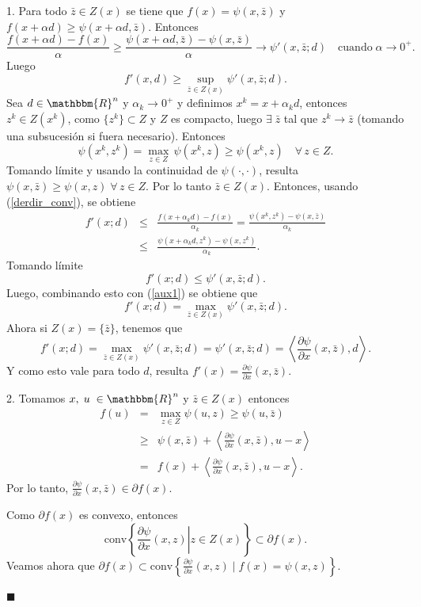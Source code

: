 \documentclass[a4paper,12pt]{report}
\newcommand{\la}{\langle}
\newcommand{\ra}{\rangle}
\newcommand{\RR}{\mathbbm{R}}
\newcommand{\Rn}{\RR^n}
\newcommand{\bz}{\bar{z}}
\newcommand{\sdif}{\partial f(x)}
\newcommand{\arr}{\rightarrow}
\newcommand{\larr}{\longrightarrow}
\newenvironment{dem}{\vspace*{-0.1cm}{\it Demostraci\'on:}}{\hfill
$\blacksquare$\\}
\begin{document}
\begin{dem}
1. Para todo $\bz\in Z(x)$ se tiene que $f(x)=\psi(x,\bz)$ y \linebreak $f(x+\alpha d)\geq\psi(x+\alpha d,\bz)$. Entonces
$$\frac{f(x+\alpha d) -f(x)}{\alpha}\geq\frac{\psi(x+\alpha d,\bz)-\psi(x,\bz)}{\alpha}\larr \psi '(x,\bz;d)\quad\mathrm{cuando}\;\alpha\arr 0^+.$$
Luego
\begin{equation}\label{aux1}
f'(x,d)\geq \sup_{\bz\in Z(x)}\psi '(x,\bz;d).
\end{equation}
Sea $d\in\Rn$ y $\alpha_k\arr 0^+$ y definimos $x^k=x+\alpha_{k}d$, entonces $z^k\in Z(x^k)$, como $\{z^k\}\subset Z$ y $Z$ es compacto, luego $\exists\;\bz$ tal que $z^k\arr \bz$ (tomando una subsucesi\'on si fuera necesario). Entonces 
$$\psi(x^k,z^k)=\max_{z\in Z}\,\psi(x^k,z)\geq\psi(x^k,z)\quad\forall\,z\in Z.$$
Tomando l\'imite y usando la continuidad de $\psi(\cdotp,\cdotp)$, resulta $\psi(x,\bz)\geq\psi(x,z)\;\forall\,z\in Z$. Por lo tanto $\bz\in Z(x)$. Entonces, usando (\ref{derdir_conv}), se obtiene 
\begin{eqnarray*}
f'(x;d)&\leq&\frac{f(x+\alpha_{k} d) -f(x)}{\alpha_{k}}=\frac{\psi(x^k,z^k)-\psi(x,\bz)}{\alpha_{k}}\\
&\leq &\frac{\psi(x+\alpha_{k} d,z^k)-\psi(x,z^k)}{\alpha_{k}}.
\end{eqnarray*}
Tomando l\'imite 
$$f'(x;d)\leq\psi '(x,\bz;d).$$
Luego, combinando esto con (\ref{aux1}) se obtiene que
$$f'(x;d)=\max_{\bz\in Z(x)}\psi '(x,\bz;d).$$
Ahora si $Z(x)=\{\bz\}$, tenemos que
$$f'(x;d)=\max_{\bz\in Z(x)}\psi '(x,\bz;d)=\psi '(x,\bz;d)=\left\la \frac{\partial \psi}{\partial x}(x,\bz),d\right\ra.$$
Y como esto vale para todo $d$, resulta $f'(x)=\frac{\partial\psi}{\partial x}(x,\bz).$

2. Tomamos $x,\;u\;\in\Rn$ y $\bz\in Z(x)$ entonces
\begin{eqnarray*}
f(u)&=&\max_{z\in Z}\psi(u,z)\geq\psi(u,\bz)\\
&\geq &\psi(x,\bz)+\left\la\frac{\partial \psi}{\partial x}(x,\bz),u-x\right\ra\\
& = & f(x)+\left\la\frac{\partial \psi}{\partial x}(x,\bz),u-x\right\ra. 
\end{eqnarray*}
Por lo tanto, $\frac{\partial \psi}{\partial x}(x,\bz)\in\partial f(x)$.

Como $\sdif$ es convexo, entonces 
$$\mathrm{conv}\left\{\left.\frac{\partial \psi}{\partial x}(x,z)\right|z\in Z(x) \right\}\subset\sdif.$$ 
Veamos ahora que $\sdif\subset\mathrm{conv}\left\{\frac{\partial \psi}{\partial x}(x,z)\mid f(x)=\psi(x,z)\right\}$. 


\end{dem}
\end{document}
